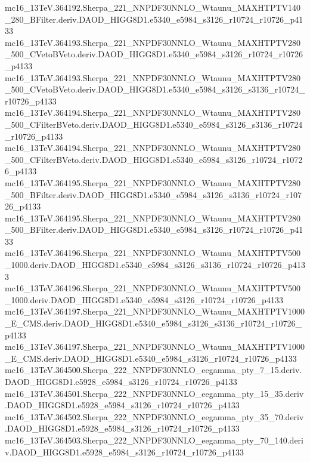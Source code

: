 \begin{footnotesize}
mc16\_13TeV.364192.Sherpa\_221\_NNPDF30NNLO\_Wtaunu\_MAXHTPTV140\_280\_BFilter.deriv.DAOD\_HIGG8D1.e5340\_e5984\_s3126\_r10724\_r10726\_p4133 \\
mc16\_13TeV.364193.Sherpa\_221\_NNPDF30NNLO\_Wtaunu\_MAXHTPTV280\_500\_CVetoBVeto.deriv.DAOD\_HIGG8D1.e5340\_e5984\_s3126\_r10724\_r10726\_p4133 \\
mc16\_13TeV.364193.Sherpa\_221\_NNPDF30NNLO\_Wtaunu\_MAXHTPTV280\_500\_CVetoBVeto.deriv.DAOD\_HIGG8D1.e5340\_e5984\_s3126\_s3136\_r10724\_r10726\_p4133 \\
mc16\_13TeV.364194.Sherpa\_221\_NNPDF30NNLO\_Wtaunu\_MAXHTPTV280\_500\_CFilterBVeto.deriv.DAOD\_HIGG8D1.e5340\_e5984\_s3126\_s3136\_r10724\_r10726\_p4133 \\
mc16\_13TeV.364194.Sherpa\_221\_NNPDF30NNLO\_Wtaunu\_MAXHTPTV280\_500\_CFilterBVeto.deriv.DAOD\_HIGG8D1.e5340\_e5984\_s3126\_r10724\_r10726\_p4133 \\
mc16\_13TeV.364195.Sherpa\_221\_NNPDF30NNLO\_Wtaunu\_MAXHTPTV280\_500\_BFilter.deriv.DAOD\_HIGG8D1.e5340\_e5984\_s3126\_s3136\_r10724\_r10726\_p4133 \\
mc16\_13TeV.364195.Sherpa\_221\_NNPDF30NNLO\_Wtaunu\_MAXHTPTV280\_500\_BFilter.deriv.DAOD\_HIGG8D1.e5340\_e5984\_s3126\_r10724\_r10726\_p4133 \\
mc16\_13TeV.364196.Sherpa\_221\_NNPDF30NNLO\_Wtaunu\_MAXHTPTV500\_1000.deriv.DAOD\_HIGG8D1.e5340\_e5984\_s3126\_s3136\_r10724\_r10726\_p4133 \\
mc16\_13TeV.364196.Sherpa\_221\_NNPDF30NNLO\_Wtaunu\_MAXHTPTV500\_1000.deriv.DAOD\_HIGG8D1.e5340\_e5984\_s3126\_r10724\_r10726\_p4133 \\
mc16\_13TeV.364197.Sherpa\_221\_NNPDF30NNLO\_Wtaunu\_MAXHTPTV1000\_E\_CMS.deriv.DAOD\_HIGG8D1.e5340\_e5984\_s3126\_s3136\_r10724\_r10726\_p4133 \\
mc16\_13TeV.364197.Sherpa\_221\_NNPDF30NNLO\_Wtaunu\_MAXHTPTV1000\_E\_CMS.deriv.DAOD\_HIGG8D1.e5340\_e5984\_s3126\_r10724\_r10726\_p4133 \\
mc16\_13TeV.364500.Sherpa\_222\_NNPDF30NNLO\_eegamma\_pty\_7\_15.deriv.DAOD\_HIGG8D1.e5928\_e5984\_s3126\_r10724\_r10726\_p4133 \\
mc16\_13TeV.364501.Sherpa\_222\_NNPDF30NNLO\_eegamma\_pty\_15\_35.deriv.DAOD\_HIGG8D1.e5928\_e5984\_s3126\_r10724\_r10726\_p4133 \\
mc16\_13TeV.364502.Sherpa\_222\_NNPDF30NNLO\_eegamma\_pty\_35\_70.deriv.DAOD\_HIGG8D1.e5928\_e5984\_s3126\_r10724\_r10726\_p4133 \\
mc16\_13TeV.364503.Sherpa\_222\_NNPDF30NNLO\_eegamma\_pty\_70\_140.deriv.DAOD\_HIGG8D1.e5928\_e5984\_s3126\_r10724\_r10726\_p4133 \\

\end{footnotesize}
